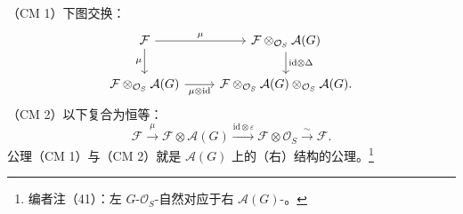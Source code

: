 （CM 1）下图交换：
\[
\begin{tikzcd}
\mathcal F\arrow[r,"{\mu}"]\arrow[d,"{\mu}"']&\mathcal F\otimes_{\mathcal O_S}\mathcal A(G)\arrow[d,"{\mathrm{id}\otimes\Delta}"]\\
\mathcal F\otimes_{\mathcal O_S}\mathcal A(G)\arrow[r,"{\mu\otimes\mathrm{id}}"']&\mathcal F\otimes_{\mathcal O_S}\mathcal A(G)\otimes_{\mathcal O_S}\mathcal A(G).
\end{tikzcd}
\]
（CM 2）以下复合为恒等：
\[
\mathcal F\xrightarrow\mu\mathcal F\otimes\mathcal A(G)\xrightarrow{\mathrm{id}\otimes\varepsilon}\mathcal F\otimes\mathcal O_S\xrightarrow\sim\mathcal F.
\]
公理（CM 1）与（CM 2）就是 $\mathcal A(G)$ 上的（右）结构的公理。\footnote{编者注（41）：左 $G$-$\mathcal O_S$-自然对应于右 $\mathcal A(G)$-。}

